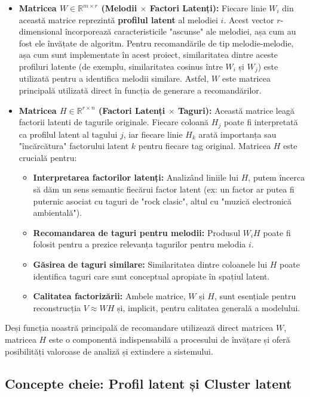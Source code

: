 \documentclass[12pt,a4paper]{article}
\begin{document}
	\begin{itemize}
		\item \textbf{Matricea $W \in \mathbb{R}^{m \times r}$ (Melodii $\times$ Factori Latenți):} Fiecare linie $W_i$ din această matrice reprezintă \textbf{profilul latent} al melodiei $i$. Acest vector $r$-dimensional încorporează caracteristicile "ascunse" ale melodiei, așa cum au fost ele învățate de algoritm. Pentru recomandările de tip melodie-melodie, așa cum sunt implementate în acest proiect, similaritatea dintre aceste profiluri latente (de exemplu, similaritatea cosinus între $W_i$ și $W_j$) este utilizată pentru a identifica melodii similare. Astfel, $W$ este matricea principală utilizată direct în funcția de generare a recomandărilor.

		\item \textbf{Matricea $H \in \mathbb{R}^{r \times n}$ (Factori Latenți $\times$ Taguri):} Această matrice leagă factorii latenti de tagurile originale. Fiecare coloană $H_j$ poate fi interpretată ca profilul latent al tagului $j$, iar fiecare linie $H_k$ arată importanța sau "încărcătura" factorului latent $k$ pentru fiecare tag original. Matricea $H$ este crucială pentru:
		\begin{itemize}
			\item \textbf{Interpretarea factorilor latenți:} Analizând liniile lui $H$, putem încerca să dăm un sens semantic fiecărui factor latent (ex: un factor ar putea fi puternic asociat cu taguri de "rock clasic", altul cu "muzică electronică ambientală").
			\item \textbf{Recomandarea de taguri pentru melodii:} Produsul $W_i H$ poate fi folosit pentru a prezice relevanța tagurilor pentru melodia $i$.
			\item \textbf{Găsirea de taguri similare:} Similaritatea dintre coloanele lui $H$ poate identifica taguri care sunt conceptual apropiate în spațiul latent.
			\item \textbf{Calitatea factorizării:} Ambele matrice, $W$ și $H$, sunt esențiale pentru reconstrucția $V \approx WH$ și, implicit, pentru calitatea generală a modelului.
		\end{itemize}
	\end{itemize}
	Deși funcția noastră principală de recomandare utilizează direct matricea $W$, matricea $H$ este o componentă indispensabilă a procesului de învățare și oferă posibilități valoroase de analiză și extindere a sistemului.

	\subsection*{Concepte cheie: Profil latent și Cluster latent}
\end{document}
